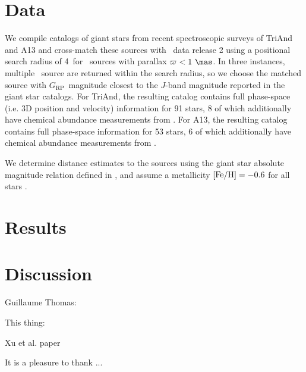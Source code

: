 \documentclass[twocolumn]{aastex62}
\newcommand{\gaia}{\project{Gaia}}
\newcommand{\dr}[1]{\acronym{DR#1}}
\newcommand{\rp}{\ensuremath{G_{\textrm{RP}}}}
\begin{document}
\section{Data}
\label{sec:data}

We compile catalogs of giant stars from recent spectroscopic surveys of TriAnd
and A13 \citep{Sheffield:2014, Li:2017, Bergemann:2018} and cross-match these
sources with \gaia\ data release 2 \citep[\dr{2};][]{TODO} using a positional
search radius of 4\arcsec\ for \gaia\ sources with parallax $\varpi < 1~\mas$.
In three instances, multiple \gaia\ source are returned within the search
radius, so we choose the matched source with \rp\ magnitude closest to the
$J$-band magnitude reported in the giant star catalogs.
For TriAnd, the resulting catalog contains full phase-space (i.e. 3D position
and velocity) information for 91 stars, 8 of which additionally have chemical
abundance measurements from \citet{Bergemann:2018}.
For A13, the resulting catalog contains full phase-space information for 53
stars, 6 of which additionally have chemical abundance measurements from
\citet{Bergemann:2018}.

We determine distance estimates to the sources using the giant star absolute
magnitude relation defined in \citet{Sheffield:2014}, and assume a metallicity
${[{\rm Fe}/{\rm H}]} = -0.6$ for all stars \citep[the TriAnd and A13 members with precise
metallicity measurements show a dispersion comparable to the measurement
uncertainty, meaning the metallicity dependence has a small effect on the
distance uncertainty;][]{Bergemann:2018}.

\section{Results}
\label{sec:results}

\section{Discussion}
\label{sec:discussion}

Guillaume Thomas:

This thing:

Xu et al. paper

\acknowledgements

It is a pleasure to thank ...

\end{document}
